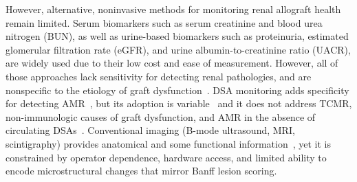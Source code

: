 However, alternative, noninvasive methods for monitoring renal allograft health remain limited. Serum biomarkers such as serum creatinine and blood urea nitrogen (BUN), as well as urine-based biomarkers such as proteinuria, estimated glomerular filtration rate (eGFR), and urine albumin-to-creatinine ratio (UACR), are widely used due to their low cost and ease of measurement. However, all of those approaches lack sensitivity for detecting renal pathologies, and are nonspecific to the etiology of graft dysfunction~\cite{goutaudier_Evaluation_2024,levey_Strengths_2019,naesens_Proteinuria_2016,porrini_Estimated_2019,sasaki_Variability_2025}. DSA monitoring adds specificity for detecting AMR~\cite{haas_Differences_2017}, but its adoption is variable~\cite{vandenbroek_Clinical_2023} and it does not address TCMR, non-immunologic causes of graft dysfunction, and AMR in the absence of circulating DSAs~\cite{loupy_Subclinical_2015}. Conventional imaging (B-mode ultrasound, MRI, scintigraphy) provides anatomical and some functional information~\cite{sugi_Imaging_2019,berchtold_Diffusionmagnetic_2022}, yet it is constrained by operator dependence, hardware access, and limited ability to encode microstructural changes that mirror Banff lesion scoring.

%

